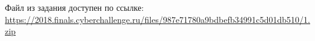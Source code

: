 
Файл из задания доступен по ссылке: \url{https://2018.finals.cyberchallenge.ru/files/987e71780a9bdbefb34991c5d01db510/1.zip}

